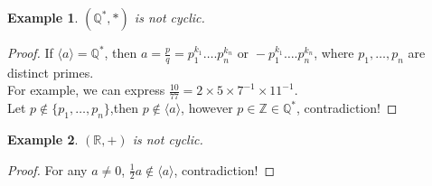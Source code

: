 \documentclass{article}
\theoremstyle{MyNonumberplain}
\theoremstyle{break}
\newtheorem*{proof}{Proof. }
\newcommand{\cyclic}[1]{\langle #1 \rangle}
\newcommand{\nin}{\not\in}
\newcommand{\infixor}{\text{ or }}
\theoremstyle{break}
\newtheorem{example}{Example}[section]
\theoremstyle{break}
\theoremstyle{definition}
\theoremstyle{break}
\begin{document}
\begin{expbox}
    \begin{example}
        $(\mathbb{Q}^{\ast}, *)$ is not cyclic.
    \end{example}
    \begin{prfbox}
        \begin{proof}
            If $\cyclic{a} =\mathbb{Q}^{\ast}$, then $a = \frac{p}{q} = p^{k_1}_1 \ldots .p^{k_n}_n \infixor - p^{k_1}_1 \ldots .p^{k_n}_n$, where $p_1, \ldots, p_n$ are distinct primes.\\
    
            For example, we can express $\frac{10}{77} = 2 \times 5 \times 7^{- 1} \times 11^{- 1}$.\\
    
            Let $p \nin \{ p_1, \ldots, p_n \}$,then $p \nin \cyclic{a}$, however $p \in \mathbb{Z} \in \mathbb{Q}^{\ast}$, contradiction!
        \end{proof}
    \end{prfbox}
    
\end{expbox}



\begin{expbox}
    \begin{example}
        $(\mathbb{R}, +)$ is not cyclic.
    \end{example}
    \begin{prfbox}
        \begin{proof}
            For any $a\neq 0$, $\frac{1}{2}a \nin \cyclic{a}$, contradiction!
        \end{proof}
    \end{prfbox}
    
\end{expbox}
\end{document}
